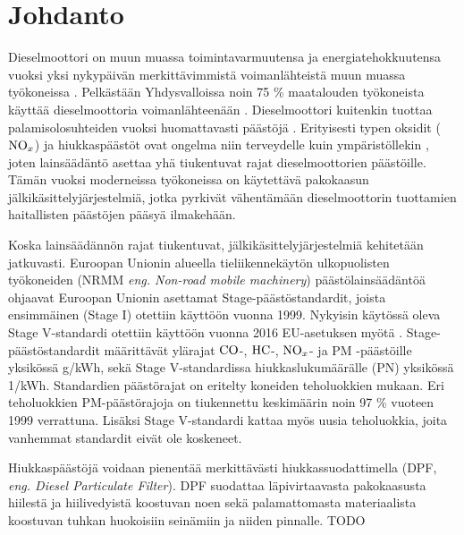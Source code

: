 \chapter{Johdanto}%
\label{ch:johdanto}
Dieselmoottori on muun muassa toimintavarmuutensa ja energiatehokkuutensa vuoksi yksi nykypäivän merkittävimmistä voimanlähteistä muun muassa työkoneissa \cite[s. 121, 137-138]{Koten_2024}.
Pelkästään Yhdysvalloissa noin 75 \% maatalouden työkoneista käyttää dieselmoottoria voimanlähteenään \cite[s. 122]{Koten_2024}.  
Dieselmoottori kuitenkin tuottaa palamisolosuhteiden vuoksi
huomattavasti päästöjä \cite{FiebigMichael2014Pefd}. Erityisesti typen oksidit (\(\ce{NO}_x\)) ja hiukkaspäästöt ovat ongelma niin terveydelle kuin ympäristöllekin \cite[s. 138]{Koten_2024}\cite{YaoDongwei2023Rodm}, joten  lainsäädäntö asettaa yhä tiukentuvat rajat dieselmoottorien päästöille. Tämän vuoksi moderneissa työkoneissa on käytettävä pakokaasun jälkikäsittelyjärjestelmiä, jotka pyrkivät vähentämään dieselmoottorin tuottamien haitallisten päästöjen pääsyä ilmakehään.

Koska lainsäädännön rajat tiukentuvat, jälkikäsittelyjärjestelmiä kehitetään jatkuvasti. Euroopan Unionin alueella tieliikennekäytön ulkopuolisten työkoneiden (NRMM \emph{eng. Non-road mobile machinery}) päästölainsäädäntöä ohjaavat Euroopan Unionin asettamat Stage-päästöstandardit, joista ensimmäinen (Stage I) otettiin käyttöön vuonna 1999. Nykyisin käytössä oleva Stage V-standardi  otettiin käyttöön vuonna 2016 EU-asetuksen myötä \cite{eu_asetus_stage_v}. Stage-päästöstandardit määrittävät ylärajat \(\ce{CO}\)-, \(\ce{HC}\)-, \(\ce{NO}_x\)- ja PM -päästöille yksikössä g/kWh, sekä Stage V-standardissa hiukkaslukumäärälle (PN) yksikössä 1/kWh.
Standardien päästörajat on eritelty koneiden teholuokkien mukaan. Eri teholuokkien PM-päästörajoja on tiukennettu keskimäärin noin 97 \% vuoteen 1999 verrattuna. Lisäksi Stage V-standardi kattaa myös uusia teholuokkia, joita vanhemmat standardit eivät ole koskeneet. \cite{dieselnet_eu_legislation}  

Hiukkaspäästöjä voidaan pienentää merkittävästi hiukkassuodattimella (DPF, \emph{eng. Diesel Particulate Filter}).
DPF suodattaa läpivirtaavasta pakokaasusta hiilestä ja hiilivedyistä koostuvan noen sekä palamattomasta materiaalista koostuvan tuhkan huokoisiin seinämiin ja niiden pinnalle. {\color{red} TODO}

